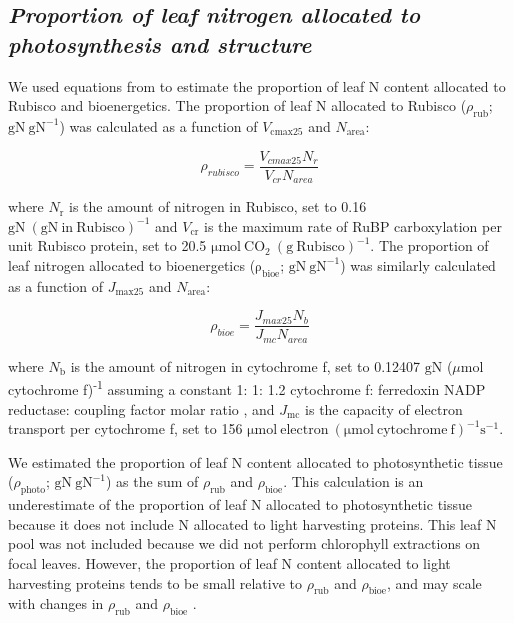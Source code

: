 \subsection{\textit{Proportion of leaf nitrogen allocated to photosynthesis and structure}}
We used equations from  to estimate the proportion of leaf N content allocated to Rubisco and bioenergetics. The proportion of leaf N allocated to Rubisco ($\rho_\mathrm{{rub}}$; $\mathrm{gN\ gN^{-1}}$) was calculated as a function of $V_\mathrm{cmax25}$ and $N_\mathrm{area}$: 

\begin{equation} \label{eqn_2.9}
    \rho_{rubisco}=\frac{V_{cmax25}N_r}{V_{cr}N_{area}}
\end{equation}

\noindent where $N_\mathrm{r}$ is the amount of nitrogen in Rubisco, set to 0.16 $\mathrm{gN\ (gN\ in\ Rubisco)^{-1}}$ and $V_\mathrm{cr}$ is the maximum rate of RuBP carboxylation per unit Rubisco protein, set to 20.5 $\mathrm{\mu mol\ CO_2\ (g\ Rubisco)^{-1}}$. The proportion of leaf nitrogen allocated to bioenergetics ($\mathrm{\rho_{bioe}}$; $\mathrm{gN\ gN^{-1}}$) was similarly calculated as a function of $J_\mathrm{max25}$ and $N_\mathrm{area}$:

\begin{equation} \label{eqn_2.10}
    \rho_{bioe}=\frac{J_{max25}N_b}{J_{mc}N_{area}}
\end{equation}

\noindent where $N_\mathrm{b}$ is the amount of nitrogen in cytochrome f, set to 0.12407 $\mathrm{gN}$ ($\mu\mathrm{mol}$ cytochrome f)\textsuperscript{-1} assuming a constant 1: 1: 1.2 cytochrome f: ferredoxin NADP reductase: coupling factor molar ratio , and $J_\mathrm{mc}$ is the capacity of electron transport per cytochrome f, set to 156 $\mathrm{\mu mol\ electron\ (\mu mol\ cytochrome\ f)^{-1} s^{-1}}$.

We estimated the proportion of leaf N content allocated to photosynthetic tissue ($\rho_\mathrm{{photo}}$; $\mathrm{gN\ gN^{-1}}$) as the sum of $\rho_\mathrm{{rub}}$ and $\rho_\mathrm{{bioe}}$. This calculation is an underestimate of the proportion of leaf N allocated to photosynthetic tissue because it does not include N allocated to light harvesting proteins. This leaf N pool was not included because we did not perform chlorophyll extractions on focal leaves. However, the proportion of leaf N content allocated to light harvesting proteins tends to be small relative to $\rho_\mathrm{{rub}}$ and $\rho_\mathrm{{bioe}}$, and may scale with changes in $\rho_\mathrm{{rub}}$ and $\rho_\mathrm{{bioe}}$ .

